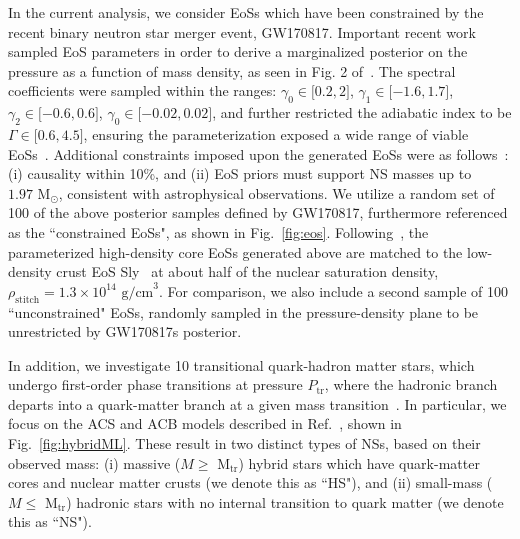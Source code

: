 \documentclass[prd,twocolumn,nofootinbib,superscriptaddress,amsmath,amssymb]{revtex4-1}
\begin{document}
In the current analysis, we consider EoSs which have been constrained by the recent binary neutron star merger event, GW170817.
Important recent work~\cite{LIGO:posterior,Carney:2018sdv} sampled EoS parameters in order to derive a marginalized posterior on the pressure as a function of mass density, as seen in Fig. 2 of~\cite{LIGO:posterior}.
The spectral coefficients were sampled within the ranges: $\gamma_0 \in \lbrack 0.2,2 \rbrack$, $\gamma_1 \in \lbrack -1.6,1.7 \rbrack$, $\gamma_2 \in \lbrack -0.6,0.6 \rbrack$, $\gamma_0 \in \lbrack -0.02,0.02 \rbrack$, and further restricted the adiabatic index to be $\Gamma \in \lbrack 0.6,4.5 \rbrack$, ensuring the parameterization exposed a wide range of viable EoSs~\cite{Lindblom:parameters}.
Additional constraints imposed upon the generated EoSs were as follows~\cite{LIGO:posterior}: (i) causality within 10\%, and (ii) EoS priors must support NS masses up to $1.97 \text{ M}_{\odot}$, consistent with astrophysical observations.
We utilize a random set of 100 of the above posterior samples defined by GW170817, furthermore referenced as the ``constrained EoSs", as shown in Fig.~\ref{fig:eos}.
Following~\cite{Read2009}, the parameterized high-density core EoSs generated above are matched to the low-density crust EoS Sly~\cite{Douchin:2001sv} at about half of the nuclear saturation density, $\rho_{\text{stitch}}=1.3 \times 10^{14} \text{ g/cm}^3$.
For comparison, we also include a second sample of 100 ``unconstrained" EoSs, randomly sampled in the pressure-density plane to be unrestricted by GW170817s posterior.

In addition, we investigate 10 transitional quark-hadron matter stars, which undergo first-order phase transitions at pressure $P_{\text{tr}}$, where the hadronic branch departs into a quark-matter branch at a given mass transition~\cite{Paschalidis2018,Alford:2017qgh,1971SvA....15..347S,Zdunik:2012dj,Alford:2013aca}.
In particular, we focus on the ACS and ACB models described in Ref.~\cite{Paschalidis2018}, shown in Fig.~\ref{fig:hybridML}.
These result in two distinct types of NSs, based on their observed mass: (i) massive ($M \geq \text{ M}_{\text{tr}}$) hybrid stars which have quark-matter cores and nuclear matter crusts (we denote this as ``HS"), and (ii) small-mass ($M \leq \text{ M}_{\text{tr}}$) hadronic stars with no internal transition to quark matter (we denote this as ``NS").
\end{document}
